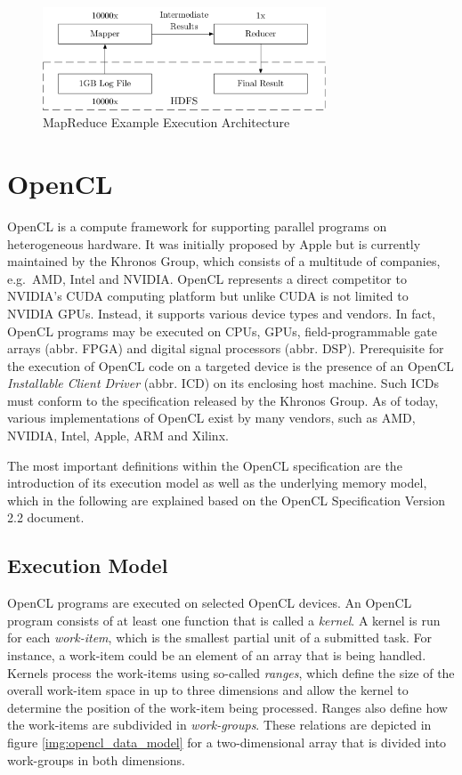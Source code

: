 \begin{figure}[!htb]
	\includegraphics[width=0.75\textwidth]{drawings/mapreduce_arch.pdf}
	\centering
	\caption{MapReduce Example Execution Architecture}
	\label{img:mapreduce_arch}
\end{figure}

\section{OpenCL}
\label{opencl}
OpenCL is a compute framework for supporting parallel programs on heterogeneous hardware. It was initially proposed by Apple but is currently maintained by the Khronos Group, which consists of a multitude of companies, e.g.~AMD, Intel and NVIDIA\cite{opencl_directors}. OpenCL represents a direct competitor to NVIDIA's CUDA computing platform but unlike CUDA is not limited to NVIDIA GPUs. Instead, it supports various device types and vendors. In fact, OpenCL programs may be executed on CPUs, GPUs, field-programmable gate arrays (abbr. FPGA) and digital signal processors (abbr. DSP). Prerequisite for the execution of OpenCL code on a targeted device is the presence of an OpenCL \textit{Installable Client Driver} (abbr. ICD) on its enclosing host machine. Such ICDs must conform to the specification released by the Khronos Group. As of today, various implementations of OpenCL exist by many vendors, such as AMD, NVIDIA, Intel, Apple, ARM and Xilinx\cite{opencl_conform}.

The most important definitions within the OpenCL specification are the introduction of its execution model as well as the underlying memory model, which in the following are explained based on the OpenCL Specification Version 2.2 document\cite{opencl_spec}.

\subsection*{Execution Model}
OpenCL programs are executed on selected OpenCL devices. An OpenCL program consists of at least one function that is called a \textit{kernel}. A kernel is run for each \textit{work-item}, which is the smallest partial unit of a submitted task. For instance, a work-item could be an element of an array that is being handled. Kernels process the work-items using so-called \textit{ranges}, which define the size of the overall work-item space in up to three dimensions and allow the kernel to determine the position of the work-item being processed. Ranges also define how the work-items are subdivided in \textit{work-groups}. These relations are depicted in figure \ref{img:opencl_data_model} for a two-dimensional array that is divided into work-groups in both dimensions.

